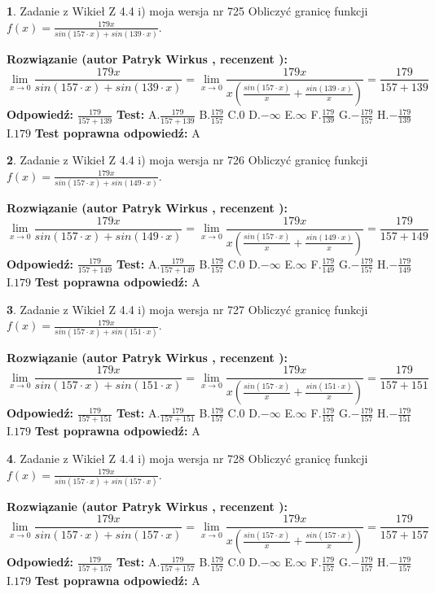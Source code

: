 \documentclass[12pt, a4paper]{article}
\theoremstyle{definition} %
\newtheorem{zad}{}
\newcommand{\zadStart}[1]{\begin{zad}#1\newline}
\newcommand{\zadStop}{\end{zad}}
\newcommand{\rozwStart}[2]{\noindent \textbf{Rozwiązanie (autor #1 , recenzent #2): }\newline}
\newcommand{\rozwStop}{\newline}
\newcommand{\odpStart}{\noindent \textbf{Odpowiedź:}\newline}
\newcommand{\odpStop}{\newline}
\newcommand{\testStart}{\noindent \textbf{Test:}\newline}
\newcommand{\testStop}{\newline}
\newcommand{\kluczStart}{\noindent \textbf{Test poprawna odpowiedź:}\newline}
\newcommand{\kluczStop}{\newline}
\begin{document}
\zadStart{Zadanie z Wikieł Z 4.4 i) moja wersja nr 725}
Obliczyć granicę funkcji $f(x)=\frac{179x}{sin(157\cdot x) +sin(139\cdot x)}$.
\zadStop
\rozwStart{Patryk Wirkus}{}
$$\lim\limits_{x\to 0}\frac{179x}{sin(157\cdot x) +sin(139\cdot x)}=\lim\limits_{x\to 0}\frac{179x}{x(\frac{sin(157\cdot x)}{x}+\frac{sin(139\cdot x)}{x})}=\frac{179}{157+139}$$
\rozwStop
\odpStart
$\frac{179}{157+139}$
\odpStop
\testStart
A.$\frac{179}{157+139}$
B.$\frac{179}{157}$
C.$0$
D.$-\infty$
E.$\infty$
F.$\frac{179}{139}$
G.$-\frac{179}{157}$
H.$-\frac{179}{139}$
I.$179$
\testStop
\kluczStart
A
\kluczStop



\zadStart{Zadanie z Wikieł Z 4.4 i) moja wersja nr 726}
Obliczyć granicę funkcji $f(x)=\frac{179x}{sin(157\cdot x) +sin(149\cdot x)}$.
\zadStop
\rozwStart{Patryk Wirkus}{}
$$\lim\limits_{x\to 0}\frac{179x}{sin(157\cdot x) +sin(149\cdot x)}=\lim\limits_{x\to 0}\frac{179x}{x(\frac{sin(157\cdot x)}{x}+\frac{sin(149\cdot x)}{x})}=\frac{179}{157+149}$$
\rozwStop
\odpStart
$\frac{179}{157+149}$
\odpStop
\testStart
A.$\frac{179}{157+149}$
B.$\frac{179}{157}$
C.$0$
D.$-\infty$
E.$\infty$
F.$\frac{179}{149}$
G.$-\frac{179}{157}$
H.$-\frac{179}{149}$
I.$179$
\testStop
\kluczStart
A
\kluczStop



\zadStart{Zadanie z Wikieł Z 4.4 i) moja wersja nr 727}
Obliczyć granicę funkcji $f(x)=\frac{179x}{sin(157\cdot x) +sin(151\cdot x)}$.
\zadStop
\rozwStart{Patryk Wirkus}{}
$$\lim\limits_{x\to 0}\frac{179x}{sin(157\cdot x) +sin(151\cdot x)}=\lim\limits_{x\to 0}\frac{179x}{x(\frac{sin(157\cdot x)}{x}+\frac{sin(151\cdot x)}{x})}=\frac{179}{157+151}$$
\rozwStop
\odpStart
$\frac{179}{157+151}$
\odpStop
\testStart
A.$\frac{179}{157+151}$
B.$\frac{179}{157}$
C.$0$
D.$-\infty$
E.$\infty$
F.$\frac{179}{151}$
G.$-\frac{179}{157}$
H.$-\frac{179}{151}$
I.$179$
\testStop
\kluczStart
A
\kluczStop



\zadStart{Zadanie z Wikieł Z 4.4 i) moja wersja nr 728}
Obliczyć granicę funkcji $f(x)=\frac{179x}{sin(157\cdot x) +sin(157\cdot x)}$.
\zadStop
\rozwStart{Patryk Wirkus}{}
$$\lim\limits_{x\to 0}\frac{179x}{sin(157\cdot x) +sin(157\cdot x)}=\lim\limits_{x\to 0}\frac{179x}{x(\frac{sin(157\cdot x)}{x}+\frac{sin(157\cdot x)}{x})}=\frac{179}{157+157}$$
\rozwStop
\odpStart
$\frac{179}{157+157}$
\odpStop
\testStart
A.$\frac{179}{157+157}$
B.$\frac{179}{157}$
C.$0$
D.$-\infty$
E.$\infty$
F.$\frac{179}{157}$
G.$-\frac{179}{157}$
H.$-\frac{179}{157}$
I.$179$
\testStop
\kluczStart
A
\kluczStop
\end{document}
